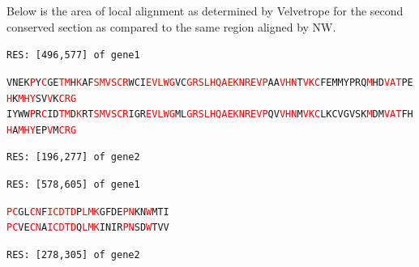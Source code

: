 \documentclass[phd,tocprelim]{cornell}
\begin{document}
Below is the area of local alignment as determined by Velvetrope for the second conserved section as compared to the same region aligned by NW.

\begin{flushleft}
\singlespacing
\footnotesize 
\texttt{RES: [496,577] of gene1}           

\texttt{VNEK\textcolor{red}{P}Y\textcolor{red}{C}GE\textcolor{red}{T}\textcolor{red}{M}H\textcolor{red}{K}AF\textcolor{red}{S}\textcolor{red}{M}\textcolor{red}{V}\textcolor{red}{S}\textcolor{red}{C}\textcolor{red}{R}WCI\textcolor{red}{E}\textcolor{red}{V}\textcolor{red}{L}\textcolor{red}{W}\textcolor{red}{G}VC\textcolor{red}{G}\textcolor{red}{R}\textcolor{red}{S}\textcolor{red}{L}\textcolor{red}{H}\textcolor{red}{Q}\textcolor{red}{A}\textcolor{red}{E}\textcolor{red}{K}\textcolor{red}{N}\textcolor{red}{R}\textcolor{red}{E}\textcolor{red}{V}\textcolor{red}{P}AA\textcolor{red}{V}\textcolor{red}{H}\textcolor{red}{N}T\textcolor{red}{V}\textcolor{red}{K}\textcolor{red}{C}FEMMYPRQ\textcolor{red}{M}HD\textcolor{red}{V}\textcolor{red}{A}\textcolor{red}{T}PE\textcolor{red}{H}K\textcolor{red}{M}\textcolor{red}{H}\textcolor{red}{Y}SV\textcolor{red}{V}K\textcolor{red}{C}\textcolor{red}{R}\textcolor{red}{G}} \\
\texttt{IYWW\textcolor{red}{P}R\textcolor{red}{C}ID\textcolor{red}{T}\textcolor{red}{M}D\textcolor{red}{K}RT\textcolor{red}{S}\textcolor{red}{M}\textcolor{red}{V}\textcolor{red}{S}\textcolor{red}{C}\textcolor{red}{R}IGR\textcolor{red}{E}\textcolor{red}{V}\textcolor{red}{L}\textcolor{red}{W}\textcolor{red}{G}ML\textcolor{red}{G}\textcolor{red}{R}\textcolor{red}{S}\textcolor{red}{L}\textcolor{red}{H}\textcolor{red}{Q}\textcolor{red}{A}\textcolor{red}{E}\textcolor{red}{K}\textcolor{red}{N}\textcolor{red}{R}\textcolor{red}{E}\textcolor{red}{V}\textcolor{red}{P}QV\textcolor{red}{V}\textcolor{red}{H}\textcolor{red}{N}M\textcolor{red}{V}\textcolor{red}{K}\textcolor{red}{C}LKCVGVSK\textcolor{red}{M}DM\textcolor{red}{V}\textcolor{red}{A}\textcolor{red}{T}FH\textcolor{red}{H}A\textcolor{red}{M}\textcolor{red}{H}\textcolor{red}{Y}EP\textcolor{red}{V}M\textcolor{red}{C}\textcolor{red}{R}\textcolor{red}{G}}

\texttt{RES: [196,277] of gene2}

\texttt{RES: [578,605] of gene1}

\texttt{\textcolor{red}{P}\textcolor{red}{C}GL\textcolor{red}{C}\textcolor{red}{N}F\textcolor{red}{I}\textcolor{red}{C}\textcolor{red}{D}\textcolor{red}{T}\textcolor{red}{D}P\textcolor{red}{L}\textcolor{red}{M}\textcolor{red}{K}GFDE\textcolor{red}{P}\textcolor{red}{N}KN\textcolor{red}{W}MTI} \\
\texttt{\textcolor{red}{P}\textcolor{red}{C}VE\textcolor{red}{C}\textcolor{red}{N}A\textcolor{red}{I}\textcolor{red}{C}\textcolor{red}{D}\textcolor{red}{T}\textcolor{red}{D}Q\textcolor{red}{L}\textcolor{red}{M}\textcolor{red}{K}INIR\textcolor{red}{P}\textcolor{red}{N}SD\textcolor{red}{W}TVV}

\texttt{RES: [278,305] of gene2}

\normalsize
\normalspacing
\end{flushleft}
\end{document}
